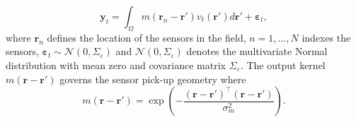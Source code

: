 \documentclass[twocolumn,11pt,a4paper]{article}		%
\begin{document}
\begin{equation}
	\mathbf{y}_t = \int_{\Omega}{m\left(\mathbf{r}_n-\mathbf{r}'\right)v_t\left(\mathbf{r}'\right)d\mathbf{r}'} + \boldsymbol{\varepsilon}_t, 
\end{equation}
where $\mathbf{r}_n$ defines the location of the sensors in the field, $n=1,...,N$ indexes the sensors, $\boldsymbol{\varepsilon}_t \sim \mathcal{N}\left(0,\Sigma_{\varepsilon}\right)$ and $\mathcal{N}\left(0,\Sigma_{\varepsilon}\right)$ denotes the multivariate Normal distribution with mean zero and covariance matrix $\Sigma_{\varepsilon}$. The output kernel $m(\mathbf{r}-\mathbf{r}')$ governs the sensor pick-up geometry where 
\begin{equation}
	m\left(\mathbf{r}-\mathbf{r}'\right) = \exp{\left(-\frac{(\mathbf{r}-\mathbf{r}')^\top(\mathbf{r}-\mathbf{r}')}{\sigma_m^2}\right)}. 
\end{equation}
\end{document}
